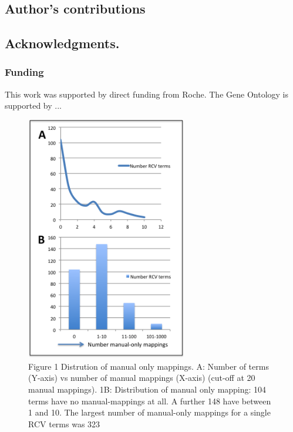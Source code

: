 \documentclass[runningheads,a4paper]{llncs}
\begin{document}
{{\subsection*{Author's contributions}


\subsection*{Acknowledgments.}

\subsubsection*{Funding}

This work was supported by direct funding from Roche.  The Gene Ontology is supported by ...










\begin{figure}
\centering
\includegraphics[width=70mm]{man_only.png}
\caption{Figure 1 Distrution of manual only mappings. A: Number of terms (Y-axis) vs number of manual mappings (X-axis) (cut-off at 20 manual mappings). 1B: Distribution of manual only mapping: 104 terms have no manual-mappings at all.  A further 148 have between 1 and 10.  The largest number of manual-only mappings for a single RCV terms was 323}
\label{fig:man_only}
\end{figure}

}}
\end{document}
